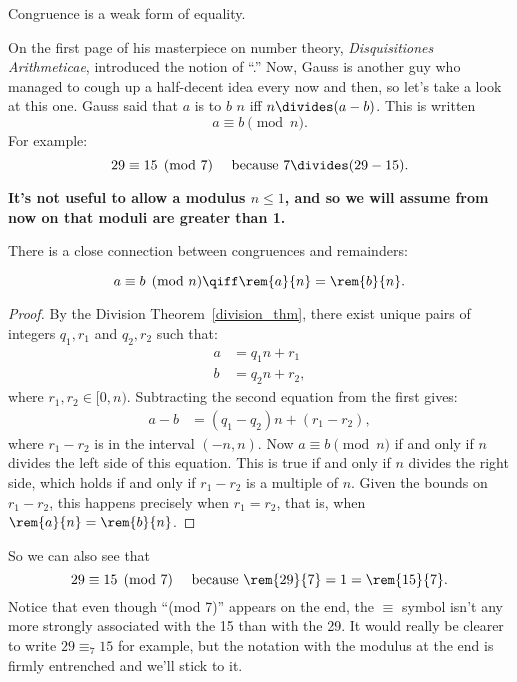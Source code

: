 \begin{editingnotes}
Congruence is a weak form of equality.
\end{editingnotes}

On the first page of his masterpiece on number theory,
\emph{Disquisitiones Arithmeticae},  introduced the notion
of ``.''  Now, Gauss is another guy who managed to
cough up a half-decent idea every now and then, so let's take a look
at this one.  Gauss said that $a$ is  to $b$
 $n$ iff $n \divides (a - b)$.  This is written
\[
a \equiv b \pmod{n}.
\]
For example:
\[
29 \equiv 15 \pmod{7} \quad\text{ because } 7 \divides (29 - 15).
\]

\textbf{It's not useful to allow a modulus $n \leq 1$, and so we will
  assume from now on that moduli are greater than 1.}

There is a close connection between congruences and remainders:
\begin{lemma}[Remainder]
\label{lem:conrem}
\[
a \equiv b \pmod{n} \qiff \rem{a}{n} = \rem{b}{n}.
\]
\end{lemma}

\begin{proof}
By the Division Theorem~\ref{division_thm}, there exist unique pairs
of integers $q_1, r_1$ and $q_2, r_2$ such that:
\begin{align*}
a & = q_1 n + r_1\\ b & = q_2 n + r_2,
\end{align*}
where $r_1,r_2 \in [0,n)$.  Subtracting the second equation from the
  first gives:
\begin{align*}
a - b & = (q_1 - q_2) n + (r_1 - r_2),
\end{align*}
where $r_1 - r_2$ is in the interval $(-n,n)$.  Now $a \equiv b
\pmod{n}$ if and only if $n$ divides the left side of this equation.
This is true if and only if $n$ divides the right side, which holds if
and only if $r_1 - r_2$ is a multiple of $n$.  Given the bounds on
$r_1 - r_2$, this happens precisely when $r_1 = r_2$, that is, when
$\rem{a}{n} = \rem{b}{n}$.
\end{proof}

So we can also see that
\[
29 \equiv 15 \pmod{7} \quad\text{ because } \rem{29}{7} = 1 =
\rem{15}{7}.
\]
Notice that even though ``(mod 7)'' appears on the end, the $\equiv$
symbol isn't any more strongly associated with the 15 than with the
29.  It would really be clearer to write $29 \equiv_7 15$ for example,
but the notation with the modulus at the end is firmly entrenched and
we'll stick to it.

